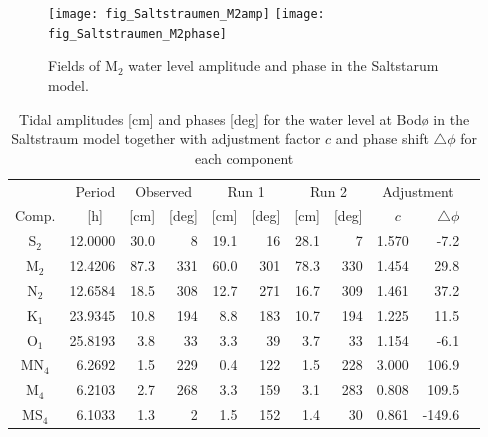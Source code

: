 \begin{figure}[!t]
\centering
\texttt{[image: fig\_Saltstraumen\_M2amp]}
\texttt{[image: fig\_Saltstraumen\_M2phase]}
\caption{Fields of M$_2$ water level amplitude and phase in the Saltstarum model.}
\label{fig:Saltstraumen_field}
\end{figure}

\begin{table}[ht]
\caption{Tidal amplitudes [cm] and phases [deg] for the water level at Bod{\o} in the Saltstraum model together with adjustment factor $c$ and phase shift $\triangle \phi$ for each component}
\label{tab:Bodo}
\centering
\begin{tabular}{crrrrrrrrrr} \hline
      & Period & \multicolumn{2}{c}{Observed} & \multicolumn{2}{c}{Run 1} & \multicolumn{2}{c}{Run 2} & \multicolumn{2}{c}{Adjustment} \\
Comp. & [h] $\;\;$ & [cm] & [deg] & [cm] & [deg] & [cm] & [deg] & $c\;\;$ & $\triangle \phi$  \\ \hline 
S$_2$   & 12.0000  &  30.0 &      8   &  19.1 &     16   &  28.1 &      7    &   1.570  &    -7.2   \\ 
M$_2$   & 12.4206  &  87.3 &    331   &  60.0 &    301   &  78.3 &    330    &   1.454  &    29.8   \\ 
N$_2$   & 12.6584  &  18.5 &    308   &  12.7 &    271   &  16.7 &    309    &   1.461  &    37.2   \\ 
K$_1$   & 23.9345  &  10.8 &    194   &   8.8 &    183   &  10.7 &    194    &   1.225  &    11.5   \\ 
O$_1$   & 25.8193  &   3.8 &     33   &   3.3 &     39   &   3.7 &     33    &   1.154  &    -6.1   \\ 
MN$_4$  &  6.2692  &   1.5 &    229   &   0.4 &    122   &   1.5 &    228    &   3.000  &   106.9   \\ 
M$_4$   &  6.2103  &   2.7 &    268   &   3.3 &    159   &   3.1 &    283    &   0.808  &   109.5   \\ 
MS$_4$  &  6.1033  &   1.3 &      2   &   1.5 &    152   &   1.4 &     30    &   0.861  &  -149.6   \\ \hline
\end{tabular}
\end{table}

